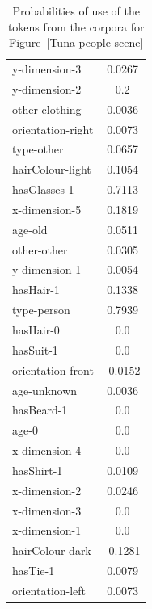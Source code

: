 \begin{table}[h!]
\begin{minipage}{0.5\textwidth}
\begin{center}
\begin{tabular}{|l|c|}
\hline
y-dimension-3 & 0.0267 \\
y-dimension-2 & 0.2 \\
other-clothing & 0.0036 \\
orientation-right & 0.0073 \\
type-other & 0.0657 \\
hairColour-light & 0.1054 \\
hasGlasses-1 & 0.7113 \\
x-dimension-5 & 0.1819 \\
age-old & 0.0511 \\
other-other & 0.0305 \\
y-dimension-1 & 0.0054 \\
hasHair-1 & 0.1338 \\
type-person & 0.7939 \\
hasHair-0 & 0.0 \\
hasSuit-1 & 0.0 \\
orientation-front & -0.0152 \\
age-unknown & 0.0036 \\
hasBeard-1 & 0.0 \\
age-0 & 0.0 \\
x-dimension-4 & 0.0 \\
hasShirt-1 & 0.0109 \\
x-dimension-2 & 0.0246 \\
x-dimension-3 & 0.0 \\
x-dimension-1 & 0.0 \\
hairColour-dark & -0.1281 \\
hasTie-1 & 0.0079 \\
orientation-left & 0.0073 \\
\hline 
\end{tabular}
\caption{Probabilities of use of the tokens from the corpora for Figure~\ref{Tuna-people-scene}} 
\label{probability-of-use-people}
\end{center}
\end{minipage}%
\end{table}


